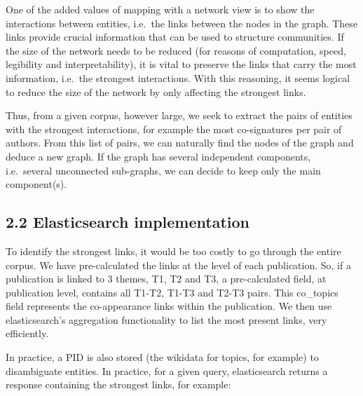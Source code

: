 \documentclass[
]{article}
\begin{document}
One of the added values of mapping with a network view is to show the
interactions between entities, i.e.~the links between the nodes in the
graph. These links provide crucial information that can be used to
structure communities. If the size of the network needs to be reduced
(for reasons of computation, speed, legibility and interpretability), it
is vital to preserve the links that carry the most information, i.e.~the
strongest interactions. With this reasoning, it seems logical to reduce
the size of the network by only affecting the strongest links.

Thus, from a given corpus, however large, we seek to extract the pairs
of entities with the strongest interactions, for example the most
co-signatures per pair of authors. From this list of pairs, we can
naturally find the nodes of the graph and deduce a new graph. If the
graph has several independent components, i.e.~several unconnected
sub-graphs, we can decide to keep only the main component(s).

\hypertarget{elasticsearch-implementation}{%
\subsection{2.2 Elasticsearch
implementation}\label{elasticsearch-implementation}}

To identify the strongest links, it would be too costly to go through
the entire corpus. We have pre-calculated the links at the level of each
publication. So, if a publication is linked to 3 themes, T1, T2 and T3,
a pre-calculated field, at publication level, contains all T1-T2, T1-T3
and T2-T3 pairs. This co\_topics field represents the co-appearance
links within the publication. We then use elasticsearch's aggregation
functionality to list the most present links, very efficiently.

In practice, a PID is also stored (the wikidata for topics, for example)
to disambiguate entities. In practice, for a given query, elasticsearch
returns a response containing the strongest links, for example:
\end{document}
